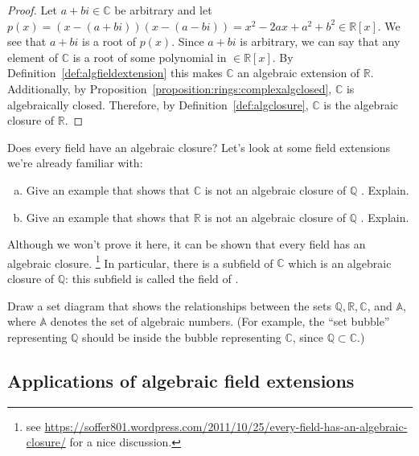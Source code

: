 \begin{proof}{}
Let $a+bi \in \mathbb{C}$ be arbitrary and let $p(x)=(x-(a+bi))(x-(a-bi))= x^2-2ax+a^2+b^2\in\mathbb{R}[x]$. We see that $a+bi$ is a root of $p(x)$. Since $a+bi$ is arbitrary, we can say that any element of $\mathbb{C}$ is a root of some polynomial in $\in\mathbb{R}[x]$. By Definition~\ref{def:algfieldextension} this makes $\mathbb{C}$ an algebraic extension of $\mathbb{R}$. Additionally, by Proposition~\ref{proposition:rings:complexalgclosed}, $\mathbb{C}$ is algebraically closed. Therefore, by Definition~\ref{def:algclosure}, $\mathbb{C}$ is the algebraic closure of $\mathbb{R}$.
\end{proof}

Does every field have an algebraic closure? Let's look at some field extensions we're already familiar with:

\begin{exercise}{}
\begin{enumerate}[(a)]
\item
Give an example that shows that $\mathbb{C}$ is not an algebraic closure of $\mathbb{Q}$ . Explain.
\item
Give an example that shows that $\mathbb{R}$ is not an algebraic closure of $\mathbb{Q}$ . Explain.
\end{enumerate}
\end{exercise}


Although we won't prove it here, it can be shown that every field has an algebraic closure.
\footnote{see  \url{https://soffer801.wordpress.com/2011/10/25/every-field-has-an-algebraic-closure/} for a nice discussion.} In particular, there is a subfield of $\mathbb{C}$ which is an algebraic closure of $\mathbb{Q}$: this subfield is called the field of .

\begin{exercise}{}
Draw a set diagram that shows the relationships between the sets $\mathbb{Q}, \mathbb{R}, \mathbb{C}$, and $\mathbb{A}$, where $\mathbb{A}$ denotes the set of algebraic numbers.  (For example, the ``set bubble'' representing $\mathbb{Q}$ should be inside the bubble representing $\mathbb{C}$, since $\mathbb{Q} \subset \mathbb{C}$.)
\end{exercise}

\subsection{Applications of algebraic field extensions}

